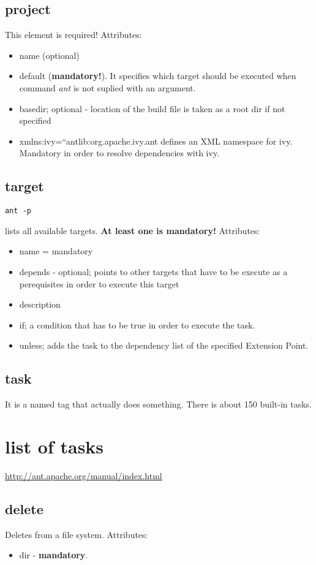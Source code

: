 \documentclass{report}
\begin{document}
\subsection{project}
This element is required! Attributes:
\begin{itemize}
  \item name (optional)
  \item default (\textbf{mandatory!}). It specifies which target should be executed when command \textit{ant} is not suplied
  with an argument. 
  \item basedir; optional - location of the build file is taken as a root dir
  if not specified
  \item xmlns:ivy=``antlib:org.apache.ivy.ant defines an XML namespace for ivy. Mandatory in order to resolve dependencies with ivy.
\end{itemize}

\subsection{target}
\begin{verbatim}
ant -p
\end{verbatim}
lists all available targets.
\textbf{At least one is mandatory!} Attributes:
\begin{itemize}
  \item name = mandatory
  \item depends - optional; points to other targets that have to be execute as a perequisites in order to 
  execute this target
  \item description
  \item if; a condition that has to be true in order to execute the task.
  \item unless; adds the task to the dependency list of the specified Extension Point.
\end{itemize}

\subsection{task}
It is a named tag that actually does something. There is about
150 built-in tasks.


\section{list of tasks}
\url{http://ant.apache.org/manual/index.html}

\subsection{delete}
Deletes from a file system. Attributes:
\begin{itemize}
  \item dir - \textbf{mandatory}.
\end{itemize}
\end{document}
